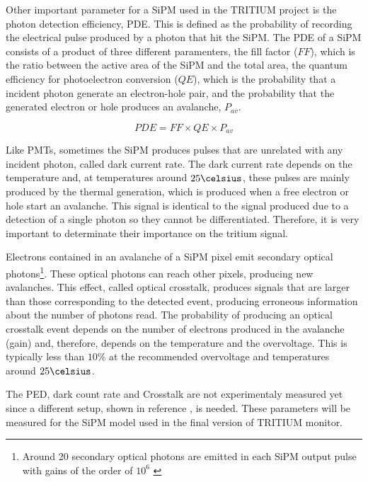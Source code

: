 Other important parameter for a SiPM used in the TRITIUM project is the photon detection efficiency, PDE. This is defined as the probability of recording the electrical pulse produced by a photon that hit the SiPM. The PDE of a SiPM consists of a product of three different paramenters, the fill factor ($FF$), which is the ratio between the active area of the SiPM and the total area, the quantum efficiency for photoelectron conversion ($QE$), which is the probability that a incident photon generate an electron-hole pair, and the probability that the generated electron or hole produces an avalanche, $P_{av}$.

\begin{equation}
PDE=FF \times QE \times P_{av}
\label{PDE_SiPM}
\end{equation}

Like PMTs, sometimes the SiPM produces pulses that are unrelated with any incident photon, called dark current rate. The dark current rate depends on the temperature and, at temperatures around $25\celsius$, these pulses are mainly produced by the thermal generation, which is produced when a free electron or hole start an avalanche. This signal is identical to the signal produced due to a detection of a single photon so they cannot be differentiated. Therefore, it is very important to determinate their importance on the tritium signal.

Electrons contained in an avalanche of a SiPM pixel emit secondary optical photons\footnote{Around 20 secondary optical photons are emitted in each SiPM output pulse with gains of the order of $10^6$ \cite{CrosstalkProbability}}. These optical photons can reach other pixels, producing new avalanches. This effect, called optical crosstalk, produces signals that are larger than those corresponding to the detected event, producing erroneous information about the number of photons read. The probability of producing an optical crosstalk event depends on the number of electrons produced in the avalanche (gain) and, therefore, depends on the temperature and the overvoltage. This is typically less than $10\%$ at the recommended overvoltage and temperatures around $25\celsius$.

The PED, dark count rate and Crosstalk are not experimentaly measured yet since a different setup, shown in reference \cite{PDEStudy}, is needed. These parameters will be measured for the SiPM model used in the final version of TRITIUM monitor.

